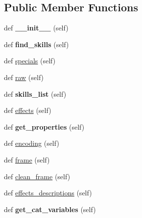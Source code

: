 \subsection*{Public Member Functions}
\begin{DoxyCompactItemize}
\item 
def {\bfseries \+\_\+\+\_\+init\+\_\+\+\_\+} (self)\hypertarget{classabilities__old_1_1_abilities_a59973e3966bea9e4d94ce91e146ac53a}{}\label{classabilities__old_1_1_abilities_a59973e3966bea9e4d94ce91e146ac53a}

\item 
def {\bfseries find\+\_\+skills} (self)\hypertarget{classabilities__old_1_1_abilities_a2253e8f1ca1b7372486ba9d113a63ff3}{}\label{classabilities__old_1_1_abilities_a2253e8f1ca1b7372486ba9d113a63ff3}

\item 
def \hyperlink{classabilities__old_1_1_abilities_ac7ff3694fd993437f43fbd7879ed5474}{specials} (self)
\item 
def \hyperlink{classabilities__old_1_1_abilities_a4f7a8e97ac0c199a6a50998e4f8f2573}{raw} (self)
\item 
def {\bfseries skills\+\_\+list} (self)\hypertarget{classabilities__old_1_1_abilities_a98baf0ce9b1bad0a9e20840aa7bce02b}{}\label{classabilities__old_1_1_abilities_a98baf0ce9b1bad0a9e20840aa7bce02b}

\item 
def \hyperlink{classabilities__old_1_1_abilities_a6f4c7cce97440feefe4e5c0b655f00c6}{effects} (self)
\item 
def {\bfseries get\+\_\+properties} (self)\hypertarget{classabilities__old_1_1_abilities_a3ecc2429b98d449f4880f9cdfe202499}{}\label{classabilities__old_1_1_abilities_a3ecc2429b98d449f4880f9cdfe202499}

\item 
def \hyperlink{classabilities__old_1_1_abilities_a674c9327e5e6090a214ba86e6c817940}{encoding} (self)
\item 
def \hyperlink{classabilities__old_1_1_abilities_a4f4663563d1287a706f692935c9ee24f}{frame} (self)
\item 
def \hyperlink{classabilities__old_1_1_abilities_a372b29b8e75d50a58d1bd58eed5f2977}{clean\+\_\+frame} (self)
\item 
def \hyperlink{classabilities__old_1_1_abilities_a44f4974d12c407d669248fea33ffd363}{effects\+\_\+descriptions} (self)
\item 
def {\bfseries get\+\_\+cat\+\_\+variables} (self)\hypertarget{classabilities__old_1_1_abilities_aaa2b3db2fcb34301f01db6216bfda8fe}{}\label{classabilities__old_1_1_abilities_aaa2b3db2fcb34301f01db6216bfda8fe}


\end{DoxyCompactItemize}
